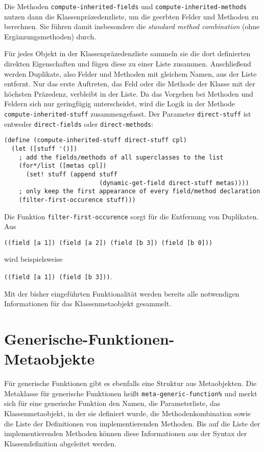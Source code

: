 Die Methoden \texttt{compute-inherited-fields} und \texttt{compute-inherited-methods} nutzen dann die Klassenpräzedenzliste, um die geerbten Felder und Methoden zu berechnen. Sie führen damit insbesondere die \textit{standard method combination} (ohne Ergänzungsmethoden) durch.

Für jedes Objekt in der Klassenpräzedenzliste sammeln sie die dort definierten direkten Eigenschaften und fügen diese zu einer Liste zusammen. Anschließend werden Duplikate, also Felder und Methoden mit gleichem Namen, aus der Liste entfernt. Nur das erste Auftreten, das Feld oder die Methode der Klasse mit der höchsten Präzedenz, verbleibt in der Liste. Da das Vorgehen bei Methoden und Feldern sich nur geringfügig unterscheidet, wird die Logik in der Methode \texttt{compute-inherited-stuff} zusammengefasst. Der Parameter \texttt{direct-stuff} ist entweder \texttt{{\textquotesingle}direct-fields} oder \texttt{{\textquotesingle}direct-methods}:

\begin{lstlisting}
(define (compute-inherited-stuff direct-stuff cpl)
  (let ([stuff '()])
    ; add the fields/methods of all superclasses to the list
    (for*/list ([metas cpl])
      (set! stuff (append stuff 
                          (dynamic-get-field direct-stuff metas))))
    ; only keep the first appearance of every field/method declaration
    (filter-first-occurence stuff)))
\end{lstlisting}

Die Funktion \texttt{filter-first-occurence} sorgt für die Entfernung von Duplikaten. Aus

\texttt{\textquotesingle((field [a 1]) (field [a 2]) (field [b 3]) (field [b 0]))}

wird beispielsweise

\texttt{\textquotesingle((field [a 1]) (field [b 3]))}.

Mit der bisher eingeführten Funktionalität werden bereits alle notwendigen Informationen für das Klassenmetaobjekt gesammelt.

\section{Generische-Funktionen-Metaobjekte}
Für generische Funktionen gibt es ebenfalls eine Struktur aus Metaobjekten. Die Metaklasse für generische Funktionen heißt \texttt{meta-generic-function\%} und merkt sich für eine generische Funktion den Namen, die Parameterliste, das Klassenmetaobjekt, in der sie definiert wurde, die Methodenkombination sowie die Liste der Definitionen von implementierenden Methoden. Bis auf die Liste der implementierenden Methoden können diese Informationen aus der Syntax der Klassendefinition abgeleitet werden.

